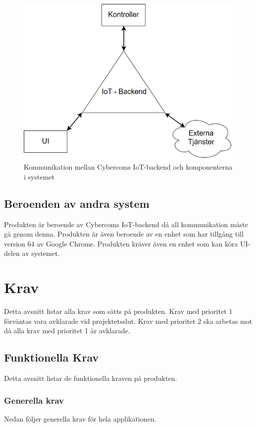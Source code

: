 \documentclass[10pt]{article}
\begin{document}
	\begin{figure}[h]
		\centering
		\includegraphics[scale=0.4]{backend}
		\caption{Kommunikation mellan Cybercoms IoT-backend och komponenterna i systemet}
		\label{fig:backend}
	\end{figure}
	
	
	\subsection{Beroenden av andra system}
	Produkten är beroende av Cybercoms IoT-backend då all kommunikation måste gå genom denna. Produkten är även beroende av en enhet som har tillgång till version 64 av Google Chrome. Produkten kräver även en enhet som kan köra UI-delen av systemet.

\pagebreak
\section{Krav}
	Detta avsnitt listar alla krav som sätts på produkten. Krav med prioritet 1 förväntas vara avklarade vid projektetsslut. Krav med prioritet 2 ska arbetas mot då alla krav med prioritet 1 är avklarade.
	\subsection{Funktionella Krav}
	Detta avsnitt listar de funktionella kraven på produkten.

	\subsubsection*{Generella krav}
	Nedan följer generella krav för hela applikationen.
	
\end{document}
